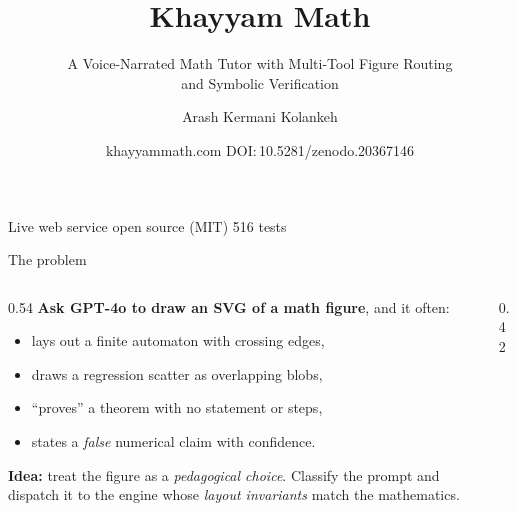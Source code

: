 \documentclass[aspectratio=169,11pt]{beamer}
\title{\textbf{Khayyam Math}}
\subtitle{A Voice-Narrated Math Tutor with Multi-Tool Figure Routing\\and Symbolic Verification}
\author{Arash Kermani Kolankeh}
\date{\small khayyammath.com \quad\textbar\quad DOI:\,10.5281/zenodo.20367146}
\begin{document}
\begin{frame}[plain]
  \titlepage
  \begin{center}\small\color{kmgrey}
  Live web service \textbullet{} open source (MIT) \textbullet{} 516 tests
  \end{center}
\end{frame}

\begin{frame}{The problem}
  \begin{columns}[T]
  \begin{column}{0.54\textwidth}
    \textbf{Ask GPT-4o to draw an SVG of a math figure}, and it often:
    \begin{itemize}
      \item lays out a finite automaton with crossing edges,
      \item draws a regression scatter as overlapping blobs,
      \item ``proves'' a theorem with no statement or steps,
      \item states a \emph{false} numerical claim with confidence.
    \end{itemize}
    \vspace{3mm}
    \textbf{Idea:} treat the figure as a \emph{pedagogical choice}.
    Classify the prompt and dispatch it to the engine whose
    \emph{layout invariants} match the mathematics.
  \end{column}
  \begin{column}{0.42\textwidth}
    \centering
  \end{column}
  \end{columns}
\end{frame}
\end{document}
